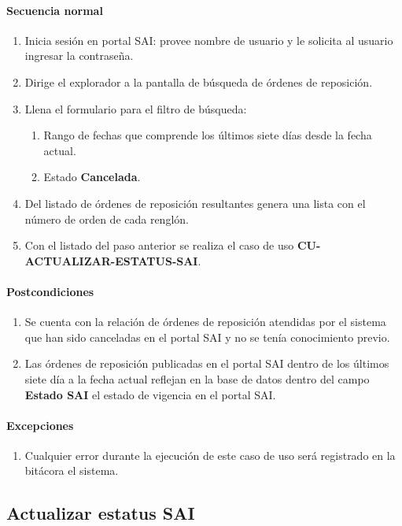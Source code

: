 \paragraph{Secuencia normal}
\begin{enumerate}
  \item Inicia sesión en portal SAI: provee nombre de usuario y le solicita al usuario ingresar la contraseña.
  \item Dirige el explorador a la pantalla de búsqueda de órdenes de reposición.
  \item Llena el formulario para el filtro de búsqueda:
  \begin{enumerate}
    \item Rango de fechas que comprende los últimos siete días desde la fecha actual.
    \item Estado \textbf{Cancelada}.
  \end{enumerate}
  \item Del listado de órdenes de reposición resultantes genera una lista con el número de orden de cada renglón.
  \item Con el listado del paso anterior se realiza el caso de uso \textbf{CU-ACTUALIZAR-ESTATUS-SAI}.
\end{enumerate}
\paragraph{Postcondiciones}
\begin{enumerate}
  \item Se cuenta con la relación de órdenes de reposición atendidas por el sistema que han sido canceladas en el portal SAI y no se tenía conocimiento previo.
  \item Las órdenes de reposición publicadas en el portal SAI dentro de los últimos siete día a la fecha actual reflejan en la base de datos dentro del campo \textbf{Estado SAI} el estado de vigencia en el portal SAI.
\end{enumerate}
\paragraph{Excepciones}
\begin{enumerate}
  \item Cualquier error durante la ejecución de este caso de uso será registrado en la bitácora el sistema.
\end{enumerate}


\subsection{Actualizar estatus SAI}
